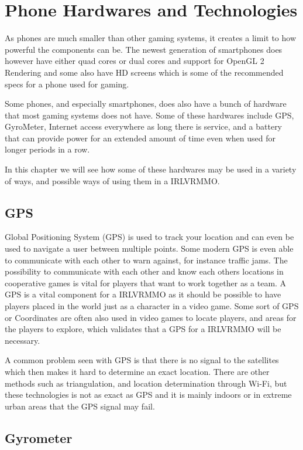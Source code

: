 \chapter{Phone Hardwares and Technologies}

As phones are much smaller than other gaming systems, it creates a limit to how powerful the components can be. The newest generation of smartphones does however have either quad cores or dual cores and support for OpenGL 2 Rendering and some also have HD screens which is some of the recommended specs for a phone used for gaming.

Some phones, and especially smartphones, does also have a bunch of hardware that most gaming systems does not have. Some of these hardwares include GPS, GyroMeter, Internet access everywhere as long there is service, and a battery that can provide power for an extended amount of time even when used for longer periods in a row.

In this chapter we will see how some of these hardwares may be used in a variety of ways, and possible ways of using them in a IRLVRMMO.


\section{GPS}

Global Positioning System (GPS) is used to track your location and can even be used to navigate a user between multiple points\cite{GPS}. Some modern GPS is even able to communicate with each other to warn against, for instance traffic jams. The possibility to communicate with each other and know each others locations in cooperative games is vital for players that want to work together as a team. A GPS is a vital component for a IRLVRMMO as it should be possible to have players placed in the world just as a character in a video game. Some sort of GPS or Coordinates are often also used in video games to locate players, and areas for the players to explore, which validates that a GPS for a IRLVRMMO will be necessary.

A common problem seen with GPS is that there is no signal to the satellites which then makes it hard to determine an exact location. There are other methods such as triangulation, and location determination through Wi-Fi, but these technologies is not as exact as GPS and it is mainly indoors or in extreme urban areas that the GPS signal may fail.


\section{Gyrometer}

